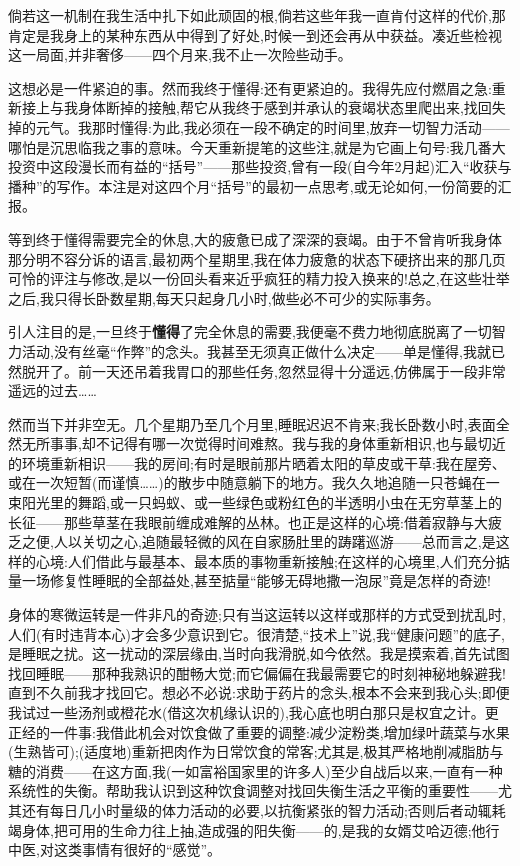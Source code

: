 倘若这一机制在我生活中扎下如此顽固的根,倘若这些年我一直肯付这样的代价,那肯定是我身上的某种东西从中得到了好处,时候一到还会再从中获益。凑近些检视这一局面,并非奢侈——四个月来,我不止一次险些动手。

\dmark{}这想必是一件紧迫的事。然而我终于懂得:还有更紧迫的。我得先应付燃眉之急:重新接上与我身体断掉的接触,帮它从我终于感到并承认的衰竭状态里爬出来,找回失掉的元气。我那时懂得:为此,我必须在一段不确定的时间里,放弃一切智力活动——哪怕是沉思临我之事的意味。今天重新提笔的这些注,就是为它画上句号:我几番大投资中这段漫长而有益的“括号”——那些投资,曾有一段(自今年2月起)汇入“收获与播种”的写作。本注是对这四个月“括号”的最初一点思考,或无论如何,一份简要的汇报。

等到终于懂得需要完全的休息,大的疲惫已成了深深的衰竭。由于不曾肯听我身体那分明不容分诉的语言,最初两个星期里,我在体力疲惫的状态下硬挤出来的那几页可怜的评注与修改,是以一份回头看来近乎疯狂的精力投入换来的!总之,在这些壮举之后,我只得长卧数星期,每天只起身几小时,做些必不可少的实际事务。

引人注目的是,一旦终于\textbf{懂得}了完全休息的需要,我便毫不费力地彻底脱离了一切智力活动,没有丝毫“作弊”的念头。我甚至无须真正做什么决定——单是懂得,我就已然脱开了。前一天还吊着我胃口的那些任务,忽然显得十分遥远,仿佛属于一段非常遥远的过去……

然而当下并非空无。几个星期乃至几个月里,睡眠迟迟不肯来;我长卧数小时,表面全然无所事事,却不记得有哪一次觉得时间难熬。我与我的身体重新相识,也与最切近的环境重新相识——我的房间;有时是眼前那片晒着太阳的草皮或干草:我在屋旁、或在一次短暂(而谨慎……)的散步中随意躺下的地方。我久久地追随一只苍蝇在一束阳光里的舞蹈,或一只蚂蚁、或一些绿色或粉红色的半透明小虫在无穷草茎上的长征——那些草茎在我眼前缠成难解的丛林\dmark{}。也正是这样的心境:借着寂静与大疲乏之便,人以关切之心,追随最轻微的风在自家肠肚里的踌躇巡游——总而言之,是这样的心境:人们借此与最基本、最本质的事物重新接触;在这样的心境里,人们充分掂量一场修复性睡眠的全部益处,甚至掂量“能够无碍地撒一泡尿”竟是怎样的奇迹!

身体的寒微运转是一件非凡的奇迹;只有当这运转以这样或那样的方式受到扰乱时,人们(有时违背本心)才会多少意识到它。很清楚,“技术上”说,我“健康问题”的底子,是睡眠之扰。这一扰动的深层缘由,当时向我滑脱,如今依然。我是摸索着,首先试图找回睡眠——那种我熟识的酣畅大觉;而它偏偏在我最需要它的时刻神秘地躲避我!直到不久前我才找回它。想必不必说:求助于药片的念头,根本不会来到我心头;即便我试过一些汤剂或橙花水(借这次机缘认识的),我心底也明白那只是权宜之计。更正经的一件事:我借此机会对饮食做了重要的调整:减少淀粉类,增加绿叶蔬菜与水果(生熟皆可);(适度地)重新把肉作为日常饮食的常客;尤其是,极其严格地削减脂肪与糖的消费——在这方面,我(一如富裕国家里的许多人)至少自战后以来,一直有一种系统性的失衡。帮助我认识到这种饮食调整对找回失衡生活之平衡的重要性——尤其还有每日几小时量级的体力活动的必要,以抗衡紧张的智力活动;否则后者动辄耗竭身体,把可用的生命力往上抽,造成强的阳失衡——的,是我的女婿艾哈迈德;他行中医,对这类事情有很好的“感觉”。

